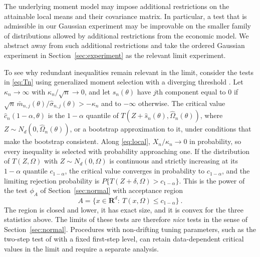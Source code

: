 \documentclass[11pt]{article}
\numberwithin{equation}{section}
\theoremstyle{definition}
\begin{document}
The underlying moment model may impose additional restrictions on the attainable local means and their covariance matrix. In particular, a test that is admissible in our Gaussian experiment may be improvable on the smaller family of distributions allowed by additional restrictions from the economic model. We abstract away from such additional restrictions and take the ordered Gaussian experiment in Section~\ref{sec:experiment} as the relevant limit experiment.

To see why redundant inequalities remain relevant in the limit, consider the tests in \eqref{eq:Tn} using generalized moment selection with a diverging threshold \citep{andrews/soares:10,Bugni:10,canay:10a}. Let $\kappa_n\to\infty$ with $\kappa_n/\sqrt n\to0$, and let $\hat s_n(\theta)$ have $j$th component equal to $0$ if $\sqrt n\,\bar m_{n,j}(\theta)/\hat\sigma_{n,j}(\theta)>-\kappa_n$ and to $-\infty$ otherwise. The critical value $\hat c_n(1-\alpha,\theta)$ is the $1-\alpha$ quantile of $T(Z+\hat s_n(\theta),\hat\Omega_n(\theta))$, where $Z\sim N_d(0,\hat\Omega_n(\theta))$, or a bootstrap approximation to it, under conditions that make the bootstrap consistent. Along \eqref{eq:local}, $X_n/\kappa_n\to0$ in probability, so every inequality is selected with probability approaching one. If the distribution of $T(Z,\Omega)$ with $Z\sim N_d(0,\Omega)$ is continuous and strictly increasing at its $1-\alpha$ quantile $c_{1-\alpha}$, the critical value converges in probability to $c_{1-\alpha}$, and the limiting rejection probability is $P\{T(Z+\delta,\Omega)>c_{1-\alpha}\}$. This is the power of the test $\phi_A$ of Section~\ref{sec:normal} with acceptance region
\[
A=\{x\in\mathbf R^d:\ T(x,\Omega)\le c_{1-\alpha}\}~.
\]
The region is closed and lower, it has exact size, and it is convex for the three statistics above. The limits of these tests are therefore \emph{nice} tests in the sense of Section~\ref{sec:normal}. Procedures with non-drifting tuning parameters, such as the two-step test of \citet{romano/shaikh/wolf:14} with a fixed first-step level, can retain data-dependent critical values in the limit and require a separate analysis.
\end{document}
